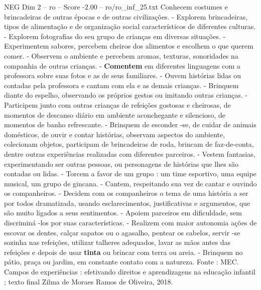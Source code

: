 \begin{textsample}{NEG Dim 2 – ro – Score -2.00 – ro/ro\_inf\_25.txt}
Conhecem costumes e brincadeiras de outras épocas e de outras civilizações. - Explorem brincadeiras, tipos de alimentação e de organização social característicos de diferentes culturas. - Explorem fotografias do seu grupo de crianças em diversas situações. - Experimentem sabores, percebem cheiros dos alimentos e escolhem o que querem comer. - Observem o ambiente e percebem aromas, texturas, sonoridades na companhia de outras crianças. - \textbf{Comentem} em diferentes linguagens com a professora sobre suas fotos e as de seus familiares. - Ouvem histórias lidas ou contadas pela professora e cantam com ela e as demais crianças. - Brinquem diante do espelho, observando os próprios gestos ou imitando outras crianças. - Participem junto com outras crianças de refeições gostosas e cheirosas, de momentos de descanso diário em ambiente aconchegante e silencioso, de momentos de banho refrescante. - Brinquem de esconder -se, de cuidar de animais domésticos, de ouvir e contar histórias, observam aspectos do ambiente, colecionam objetos, participam de brincadeiras de roda, brincam de faz-de-conta, dentre outras experiências realizadas com diferentes parceiros. - Vestem fantasias, experimentando ser outras pessoas, ou personagens de histórias que lhes são contadas ou lidas. - Torcem a favor de um grupo : um time esportivo, uma equipe musical, um grupo de gincana. - Cantem, respeitando sua vez de cantar e ouvindo os companheiros. - Decidem com os companheiros o tema de uma história a ser por todos dramatizada, usando esclarecimentos, justificativas e argumentos, que são muito ligados a seus sentimentos. - Apoiem parceiros em dificuldade, sem discriminá -los por suas características. - Realizem com maior autonomia ações de escovar os dentes, calçar sapatos ou o agasalho, pentear os cabelos, servir -se sozinha nas refeições, utilizar talheres adequados, lavar as mãos antes das refeições e depois de usar \textbf{tinta} ou brincar com terra ou areia. - Brinquem no pátio, praça ou jardim, em constante contato com a natureza.
Fonte : MEC.
Campos de experiências : efetivando direitos e aprendizagens na educação infantil ; texto final Zilma de Moraes Ramos de Oliveira, 2018.

\end{textsample}
